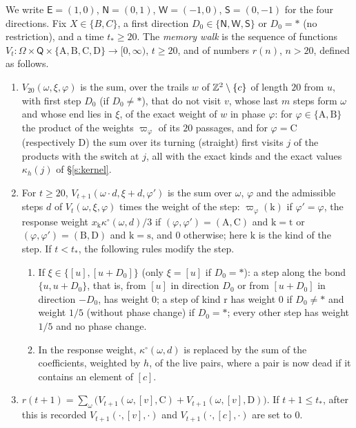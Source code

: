 We write $\mathsf E = (1, 0)$, $\mathsf N = (0, 1)$, $\mathsf W = (-1, 0)$, $\mathsf S = (0, -1)$ for the four directions. Fix $X \in \{B, C\}$, a first direction $D_0 \in \{\mathsf N, \mathsf W, \mathsf S\}$ or $D_0 = \ast$ (no restriction), and a time $t_* \ge 20$. The \emph{memory walk} is the sequence of functions $V_t \colon \Omega \times \mathsf Q \times \{\mathrm A, \mathrm B, \mathrm C, \mathrm D\} \to [0, \infty)$, $t \ge 20$, and of numbers $r(n)$, $n > 20$, defined as follows.
\begin{enumerate}
\item[(I)] $V_{20}(\omega, \xi, \varphi)$ is the sum, over the trails $w$ of $\mathbb{Z}^2 \setminus \{c\}$ of length $20$ from $u$, with first step $D_0$ (if $D_0 \neq \ast$), that do not visit $v$, whose last $m$ steps form $\omega$ and whose end lies in $\xi$, of the exact weight of $w$ in phase $\varphi$: for $\varphi \in \{\mathrm A, \mathrm B\}$ the product of the weights $\varpi_\varphi$ of its $20$ passages, and for $\varphi = \mathrm C$ (respectively $\mathrm D$) the sum over its turning (straight) first visits $j$ of the products with the switch at $j$, all with the exact kinds and the exact values $\kappa_h(j)$ of \S\ref{s:kernel}.
\item[(II)] For $t \ge 20$, $V_{t + 1}(\omega \cdot d, \xi + d, \varphi')$ is the sum over $\omega$, $\varphi$ and the admissible steps $d$ of $V_t(\omega, \xi, \varphi)$ times the weight of the step: $\varpi_\varphi(\mathrm k)$ if $\varphi' = \varphi$, the response weight $x_{\mathrm k} \kappa^\circ(\omega, d)/3$ if $(\varphi, \varphi') = (\mathrm A, \mathrm C)$ and $\mathrm k = \mathrm t$ or $(\varphi, \varphi') = (\mathrm B, \mathrm D)$ and $\mathrm k = \mathrm s$, and $0$ otherwise; here $\mathrm k$ is the kind of the step. If $t < t_*$, the following rules modify the step.
\begin{enumerate}
\item[(R1)] If $\xi \in \{[u], [u + D_0]\}$ (only $\xi = [u]$ if $D_0 = \ast$): a step along the bond $\{u, u + D_0\}$, that is, from $[u]$ in direction $D_0$ or from $[u + D_0]$ in direction $-D_0$, has weight $0$; a step of kind $\mathrm r$ has weight $0$ if $D_0 \neq \ast$ and weight $1/5$ (without phase change) if $D_0 = \ast$; every other step has weight $1/5$ and no phase change.
\item[(R2)] In the response weight, $\kappa^\circ(\omega, d)$ is replaced by the sum of the coefficients, weighted by $h$, of the live pairs, where a pair is now dead if it contains an element of $[c]$.
\end{enumerate}
\item[(III)] $r(t + 1) = \sum_\omega \bigl( V_{t + 1}(\omega, [v], \mathrm C) + V_{t + 1}(\omega, [v], \mathrm D) \bigr)$. If $t + 1 \le t_*$, after this is recorded $V_{t + 1}(\cdot, [v], \cdot)$ and $V_{t + 1}(\cdot, [c], \cdot)$ are set to $0$.
\end{enumerate}
